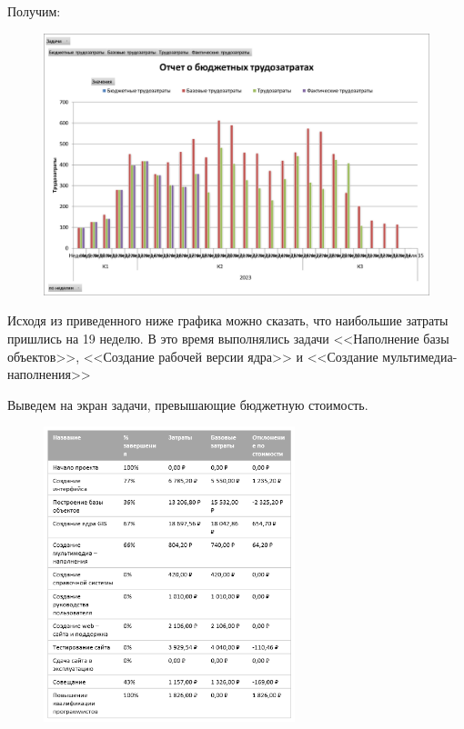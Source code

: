 Получим:

\begin{figure}[H]
	\begin{center}
		\includegraphics[width=\textwidth]{imgs/task_2_2.png}
	\end{center}
\end{figure}

Исходя из приведенного ниже графика можно сказать, что наибольшие затраты пришлись на 19 неделю. В это время выполнялись задачи <<Наполнение базы объектов>>, <<Создание рабочей версии ядра>> и <<Создание мультимедиа-наполнения>>

Выведем на экран задачи, превышающие бюджетную стоимость.

\begin{figure}[H]
	\begin{center}
		\includegraphics[width=0.65\textwidth]{imgs/task_2_3.png}
	\end{center}
\end{figure}

